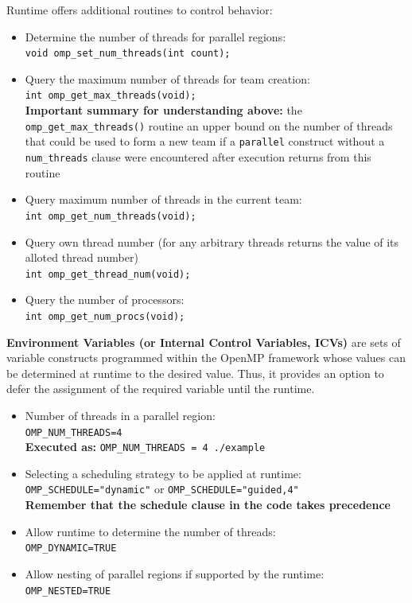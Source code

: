 \documentclass[12pt, a4paper]{report}
\begin{document}
\begin{tcolorbox}[breakable, enhanced jigsaw, width=\textwidth,colback={white},title={{\bfseries{Important routines and environment variables}}\dots},colbacktitle={rosetaupe},coltitle=white]    
Runtime offers additional routines to control behavior:
\begin{itemize}
    \item Determine the number of threads for parallel regions:\\
          \verb$void omp_set_num_threads(int count);$
    \item Query the maximum number of threads for team creation:\\
          \verb$int omp_get_max_threads(void);$\\
          {\bfseries{Important summary for understanding above:}} the \verb$omp_get_max_threads()$ routine an upper bound on the number of threads that could be 
          used to form a new team if a \verb$parallel$ construct without a \verb$num_threads$ clause were encountered after execution returns from this routine
    \item Query maximum number of threads in the current team:\\
          \verb$int omp_get_num_threads(void);$
    \item Query own thread number (for any arbitrary threads returns the value of its alloted thread number)\\
          \verb$int omp_get_thread_num(void);$
    \item Query the number of processors:\\
          \verb$int omp_get_num_procs(void);$
\end{itemize}
\vspace{2em}
{\bfseries{Environment Variables (or Internal Control Variables, ICVs)}} are sets of variable constructs programmed within the OpenMP framework whose values can be determined 
at runtime to the desired value. Thus, it provides an option to defer the assignment of the required variable until the runtime.
\begin{itemize}
    \item Number of threads in a parallel region:\\
          \verb$OMP_NUM_THREADS=4$\\
          {\bfseries{Executed as:}} \verb$OMP_NUM_THREADS = 4 ./example$
    \item Selecting a scheduling strategy to be applied at runtime:\\
          \verb$OMP_SCHEDULE="dynamic"$ or \verb$OMP_SCHEDULE="guided,4"$\\
          {\bfseries{Remember} that the schedule clause in the code takes precedence}
    \item Allow runtime to determine the number of threads:\\
          \verb$OMP_DYNAMIC=TRUE$ 
    \item Allow nesting of parallel regions if supported by the runtime:\\
          \verb$OMP_NESTED=TRUE$    
\end{itemize}
\end{tcolorbox}
\end{document}
